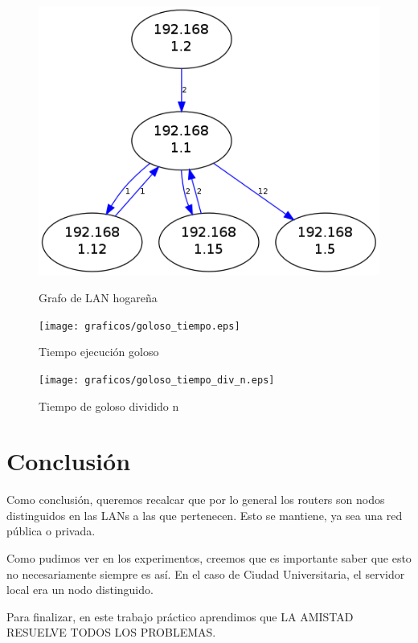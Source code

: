 \documentclass[10pt, a4paper]{article}
\begin{document}
\begin{figure}[H]
  \begin{center}
    \includegraphics[width=\linewidth/2]{../imgs/pruebaFede-ips_red.png}
    \label{fig:FedeGrafo}
    \caption{Grafo de LAN hogareña}
  \end{center}
\end{figure}


 \begin{figure}[H]
   \begin{minipage}{0.5\linewidth}
     \texttt{[image: graficos/goloso\_tiempo.eps]}
     \caption{Tiempo ejecución goloso}\label{fig:goloso-tiempo}
   \end{minipage}
  \hfill
   \begin{minipage}{0.5\linewidth}
     \texttt{[image: graficos/goloso\_tiempo\_div\_n.eps]}
     \caption{Tiempo de goloso dividido n}\label{fig:goloso-tiempo-n}
   \end{minipage}
 \end{figure}



\section{Conclusión}
Como conclusión, queremos recalcar que por lo general los routers son nodos distinguidos en las LANs a las que pertenecen. Esto se mantiene, ya sea una red pública o privada.

Como pudimos ver en los experimentos, creemos que es importante saber que esto no necesariamente siempre es así. En el caso de Ciudad Universitaria, el servidor local era un nodo distinguido.

Para finalizar, en este trabajo práctico aprendimos que LA AMISTAD RESUELVE TODOS LOS PROBLEMAS.
\end{document}
